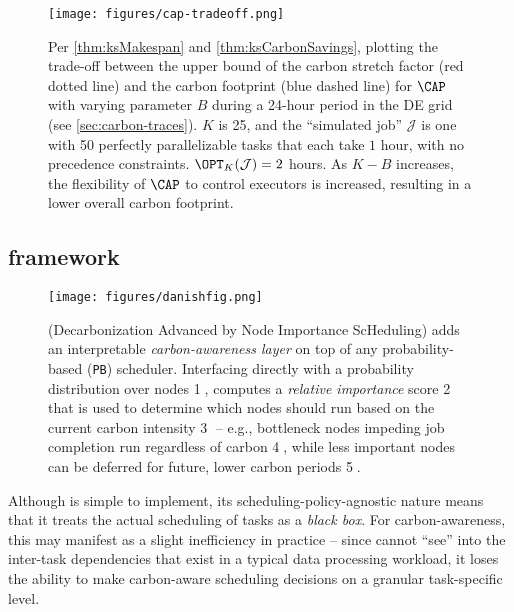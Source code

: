 \begin{figure}[h]
    \centering
    \texttt{[image: figures/cap-tradeoff.png]} 
    \caption{Per \autoref{thm:ksMakespan} and \autoref{thm:ksCarbonSavings}, plotting the trade-off between the upper bound of the carbon stretch factor (red dotted line) and the carbon footprint (blue dashed line) for $\CAP$ with varying parameter $B$ during a 24-hour period in the DE grid (see \autoref{sec:carbon-traces}).  $K$ is 25, and the ``simulated job'' $\mathcal{J}$ is one with 50 perfectly parallelizable tasks that each take $1$ hour, with no precedence constraints.  $\OPT_K(\mathcal{J}) = 2$ hours.  As $K-B$ increases, the flexibility of $\CAP$ to control executors is increased, resulting in a lower overall carbon footprint. }
    \label{fig:cap-tradeoff}
\end{figure}


\subsection{\DANISH framework} \label{sec:danish-design}

\begin{figure}[h]
    \centering
    \texttt{[image: figures/danishfig.png]}
    \caption{\DANISH (Decarbonization Advanced by Node Importance ScHeduling) adds an interpretable \textit{carbon-awareness layer} on top of any probability-based (\texttt{PB}) scheduler. Interfacing directly with a probability distribution over nodes \textcircled{1}, \DANISH computes a \textit{relative importance} score \textcircled{2} that is used to determine which nodes should run based on the current carbon intensity \textcircled{3} -- e.g., bottleneck nodes impeding job completion run regardless of carbon \textcircled{4}, while less important nodes can be deferred for future, lower carbon periods \textcircled{5}.}
    \label{fig:danish-diagram}
\end{figure}

Although \CAP is simple to implement, its scheduling-policy-agnostic nature means that it treats the actual scheduling of tasks as a \textit{black box}.  For carbon-awareness, this may manifest as a slight inefficiency in practice -- since \CAP cannot ``see'' into the inter-task dependencies that exist in a typical data processing workload, it loses the ability to make carbon-aware scheduling decisions on a granular task-specific level.

